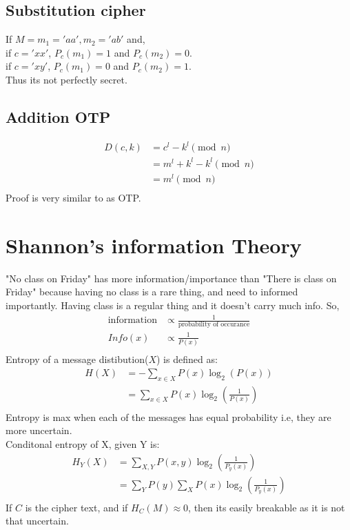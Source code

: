 \documentclass[english, 11pt]{article}
\begin{document}
\subsection*{Substitution cipher}
If $M = {m_1='aa',m_2='ab'}$ and,\\
if $c='xx'$, $P_c(m_1) = 1$ and $P_c(m_2) = 0$. \\
if $c='xy'$, $P_c(m_1) = 0$ and $P_c(m_2) = 1$. \\
Thus its not perfectly secret.

\subsection*{Addition OTP}

\begin{align*}
  D(c,k) &= c^l - k^l \pmod{n} \\
  &= m^l + k^l - k^l \pmod{n}\\
  &= m^l \pmod{n}\\
\end{align*}
Proof is very similar to as OTP.

\section*{Shannon's information Theory}
"No class on Friday" has more information/importance than "There is class on Friday" because having no class is a rare thing, and need to informed importantly. Having class is a regular thing and it doesn't carry much info.
So,
\begin{align*}
  \text{information} &\propto \frac{1}{\text{probability of occurance}} \\
  Info(x) &\propto \frac{1}{P(x)} \\
\end{align*}
Entropy of a message distibution($X$) is defined as:
\begin{align*}
  H(X) &= -\sum_{x \in X} P(x) \log_{2}(P(x)) \\
  &= \sum_{x \in X} P(x) \log_{2}(\frac{1}{P(x)}) \\
\end{align*}
Entropy is max when each of the messages has equal probability i.e, they are more uncertain. \\
Conditonal entropy of X, given Y is:
\begin{align*}
  H_Y(X)&= \sum_{X,Y} P(x,y) \log_{2}(\frac{1}{P_y(x)}) \\
  &= \sum_{Y} P(y) \sum_{X} P(x) \log_{2}(\frac{1}{P_y(x)}) \\
\end{align*}
If $C$ is the cipher text, and if $ H_C(M) \approx 0 $, then its easily breakable as it is not that uncertain.
\end{document}
